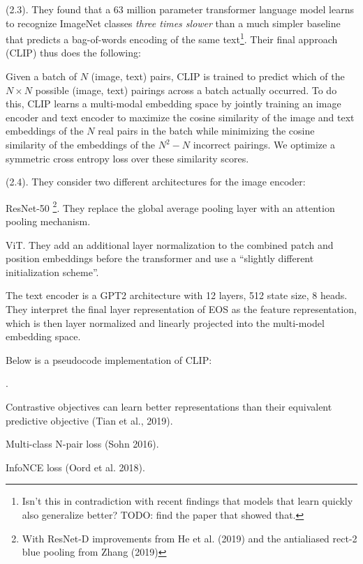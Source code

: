 \documentclass[11pt]{article}
\begin{document}
 (2.3). They found that a 63 million parameter transformer language model learns to recognize ImageNet classes \textit{three times
slower} than a much simpler baseline that predicts a bag-of-words encoding of the same text\footnote{Isn't this in contradiction with recent findings that models that learn quickly also generalize better? TODO: find the paper that showed that.}. Their final approach (CLIP) thus does the following:
\begin{myquote}
	Given a batch of $N$ (image, text) pairs, CLIP is trained to predict which of the $N \times N$ possible (image, text) pairings across a batch actually occurred. To do this, CLIP learns a multi-modal embedding space by jointly training an image encoder and text encoder to maximize the cosine similarity of the image and text embeddings of the $N$ real pairs in the batch while minimizing the cosine similarity of the embeddings of the $N^2 - N$ incorrect pairings. We optimize a symmetric cross entropy loss over these similarity scores.
\end{myquote}

 (2.4). They consider two different architectures for the image encoder:
\begin{compactitem}
	\item ResNet-50 \footnote{With ResNet-D improvements from He et al. (2019) and the antialiased rect-2 blue pooling from Zhang (2019)}. They replace the global average pooling layer with an attention pooling mechanism.
	
	\item ViT. They add an additional layer normalization to the combined patch and position embeddings before the transformer and use a ``slightly different initialization scheme''.
\end{compactitem}
The text encoder is a GPT2 architecture with 12 layers, 512 state size, 8 heads. They interpret the final layer representation of EOS as the feature representation, which is then layer normalized and linearly projected into the multi-model embedding space. 

Below is a pseudocode implementation of CLIP:



. 
\begin{compactitem}
	\item Contrastive objectives can learn better representations than their equivalent predictive objective (Tian et al., 2019).
	\item Multi-class N-pair loss (Sohn 2016). 
	\item InfoNCE loss (Oord et al. 2018).
\end{compactitem}
\end{document}
